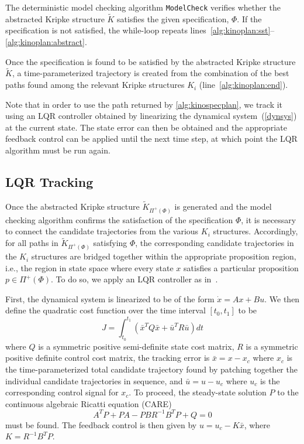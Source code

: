  The deterministic \mucalc{} model checking algorithm \texttt{ModelCheck} verifies whether the abstracted Kripke structure $\tilde{K}$ satisfies the given specification, $\Phi$. If the specification is not satisfied, the while-loop repeats lines~\ref{alg:kinoplan:sst}--\ref{alg:kinoplan:abstract}.

 Once the specification is found to be satisfied by the abstracted Kripke structure $\tilde{K}$, a time-parameterized trajectory is created from the combination of the best paths found among the relevant Kripke structures $K_i$ (line~\ref{alg:kinoplan:end}).

 Note that in order to use the path returned by \autoref{alg:kinospecplan}, we track it using an LQR controller obtained by linearizing the dynamical system~(\ref{dynsys}) at the current state. The state error can then be obtained and the appropriate feedback control can be applied until the next time step, at which point the LQR algorithm must be run again. 

 \subsection{LQR Tracking}\label{section:lqr}

Once the abstracted Kripke structure $\tilde{K}_{\Pi^+(\Phi)}$ is generated and the model checking algorithm confirms the satisfaction of the \mucalc{} specification $\Phi$, it is necessary to connect the candidate trajectories from the various $K_i$ structures. Accordingly, for all paths in $\tilde{K}_{\Pi^+(\Phi)}$ satisfying $\Phi$, the corresponding candidate trajectories in the $K_i$ structures are bridged together within the appropriate proposition region, i.e., the region in state space where every state $x$ satisfies a particular proposition $p \in \Pi^+(\Phi)$. To do so, we apply an LQR controller as in~\cite{Tedrake2009}.

First, the dynamical system is linearized to be of the form $\dot x = Ax + Bu$. We then define the quadratic cost function over the time interval $[ t_0, t_1 ]$ to be
\begin{equation}
    J = \int_{t_0}^{t_1} \left( {\bar x}^T Q {\bar x} + {\bar u}^T R {\bar u} \right)dt
\end{equation}
where $Q$ is a symmetric positive semi-definite state cost matrix, $R$ is a symmetric positive definite control cost matrix, the tracking error is $\bar x = x - x_c$ where $x_c$ is the time-parameterized total candidate trajectory found by patching together the individual candidate trajectories in sequence, and $\bar u = u - u_c$ where $u_c$ is the corresponding control signal for $x_c$. To proceed, the steady-state solution $P$ to the continuous algebraic Ricatti equation (CARE)
\begin{equation}
    A^T P + PA - PBR^{-1}B^T P + Q = 0 
\end{equation}
must be found. The feedback control is then given by $u = u_c - K{\bar x}$, where $K = R^{-1}B^T P$.


